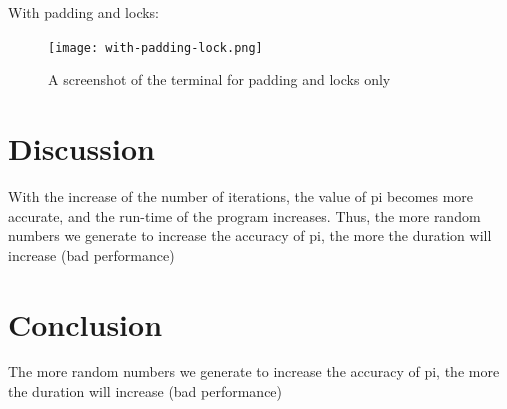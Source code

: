 \documentclass[10pt,a4paper]{article} %
\begin{document}
With padding and locks:

\begin{figure}[htp]
    \centering
    \texttt{[image: with-padding-lock.png]}
    \caption{A screenshot of the terminal for padding and locks only}
    \label{fig:termianl}
\end{figure}

\section{Discussion}

With the increase of the number of iterations, the value
of pi becomes more accurate, and the run-time of the program increases. Thus, the more random numbers we generate to increase the accuracy of pi, the more the duration will
increase (bad performance)


\section{Conclusion}
The more random numbers we generate to increase the accuracy of pi, the more the duration will
increase (bad performance)

\end{document}
